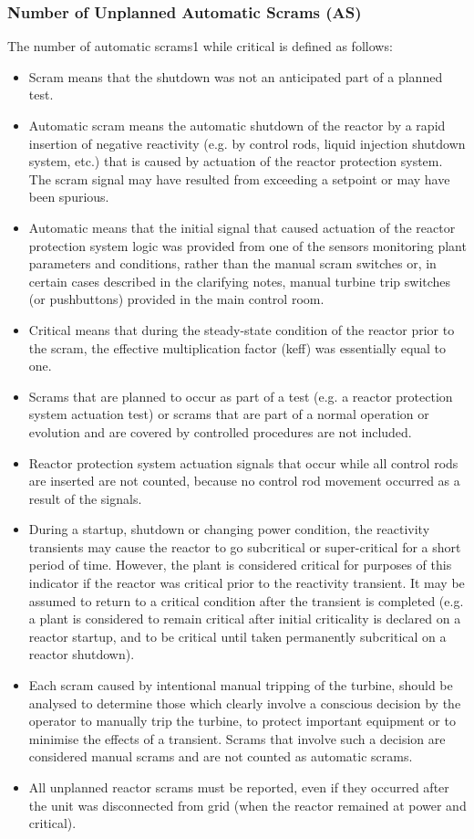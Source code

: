 \subsubsection{Number of Unplanned Automatic Scrams (AS)}

The number of automatic scrams1 while critical is defined as follows:
\begin{itemize}
\item Scram means that the shutdown was not an anticipated part of a planned test.
\item Automatic scram means the automatic shutdown of the reactor by a rapid insertion of negative reactivity (e.g. by control rods, liquid injection shutdown system, etc.) that is caused by actuation of the reactor protection system. The scram signal may have resulted from exceeding a setpoint or may have been spurious.
\item Automatic means that the initial signal that caused actuation of the reactor protection system logic was provided from one of the sensors monitoring plant parameters and conditions, rather than the manual scram switches or, in certain cases described in the clarifying notes, manual turbine trip switches (or pushbuttons) provided in the main control room.
\item Critical means that during the steady-state condition of the reactor prior to the scram, the effective multiplication factor (keff) was essentially equal to one.
\item Scrams that are planned to occur as part of a test (e.g. a reactor protection system actuation test) or scrams that are part of a normal operation or evolution and are covered by controlled procedures are not included.
\item Reactor protection system actuation signals that occur while all control rods are inserted are not counted, because no control rod movement occurred as a result of the signals.
\item During a startup, shutdown or changing power condition, the reactivity transients may cause the reactor to go subcritical or super-critical for a short period of time. However, the plant is considered critical for purposes of this indicator if the reactor was critical prior to the reactivity transient. It may be assumed to return to a critical condition after the transient is completed (e.g. a plant is considered to remain critical after initial criticality is declared on a reactor startup, and to be critical until taken permanently subcritical on a reactor shutdown).
\item Each scram caused by intentional manual tripping of the turbine, should be analysed to determine those which clearly involve a conscious decision by the operator to manually trip the turbine, to protect important equipment or to minimise the effects of a transient. Scrams that involve such a decision are considered manual scrams and are not counted as automatic scrams.
\item All unplanned reactor scrams must be reported, even if they
  occurred after the unit was disconnected from grid (when the reactor
  remained at power and critical).
\end{itemize}

